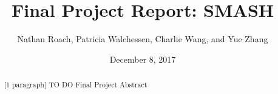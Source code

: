 \documentclass[12pt, letterpaper]{article}
\title{Final Project Report: SMASH}
\author{Nathan Roach, Patricia Walchessen, Charlie Wang, and Yue Zhang}
\date{December 8, 2017}
\begin{document}
\maketitle
\begin{abstract}
	[1 paragraph] \color{red} TO DO \color{black} Final Project Abstract
\end{abstract}

\end{document}
